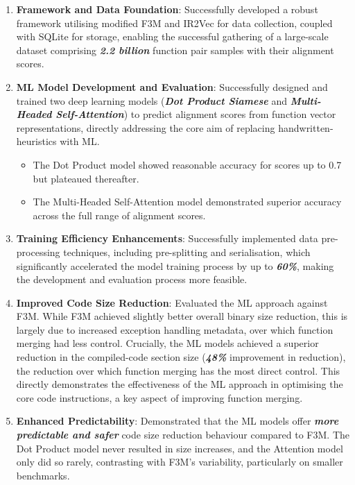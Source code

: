 \begin{enumerate}
    \item \textbf{Framework and Data Foundation}: Successfully developed a robust framework utilising modified F3M and IR2Vec for data collection, coupled with SQLite for storage, enabling the successful gathering of a large-scale dataset comprising \textbf{\textit{2.2 billion}} function pair samples with their alignment scores.

    \item \textbf{ML Model Development and Evaluation}: Successfully designed and trained two deep learning models (\textbf{\textit{Dot Product Siamese}} and \textbf{\textit{Multi-Headed Self-Attention}}) to predict alignment scores from function vector representations, directly addressing the core aim of replacing handwritten-heuristics with ML.
    \begin{itemize}
        \item The Dot Product model showed reasonable accuracy for scores up to 0.7 but plateaued thereafter.
        \item The Multi-Headed Self-Attention model demonstrated superior accuracy across the full range of alignment scores.
    \end{itemize}

    \item \textbf{Training Efficiency Enhancements}: Successfully implemented data pre-processing techniques, including pre-splitting and serialisation, which significantly accelerated the model training process by up to \textbf{\textit{60\%}}, making the development and evaluation process more feasible.

    \item \textbf{Improved Code Size Reduction}: Evaluated the ML approach against F3M. While F3M achieved slightly better overall binary size reduction, this is largely due to increased exception handling metadata, over which function merging had less control. Crucially, the ML models achieved a superior reduction in the compiled-code section size (\textbf{\textit{48\%}} improvement in reduction), the reduction over which function merging has the most direct control. This directly demonstrates the effectiveness of the ML approach in optimising the core code instructions, a key aspect of improving function merging.

    \item \textbf{Enhanced Predictability}: Demonstrated that the ML models offer\textbf{\textit{ more predictable and safer}} code size reduction behaviour compared to F3M. The Dot Product model never resulted in size increases, and the Attention model only did so rarely, contrasting with F3M's variability, particularly on smaller benchmarks.


\end{enumerate}
